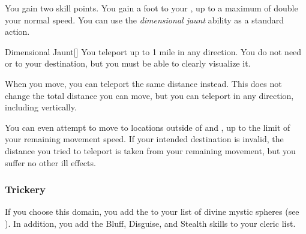              You gain two skill points.
             You gain a  foot  to your , up to a maximum of double your normal speed.
             You can use the \textit{dimensional jaunt} ability as a standard action.
            \begin{apability}{Dimensional Jaunt}[]
                You teleport up to 1 mile in any direction.
                You do not need  or  to your destination, but you must be able to clearly visualize it.
            \end{apability}
             When you move, you can teleport the same distance instead.
            This does not change the total distance you can move, but you can teleport in any direction, including vertically.

            You can even attempt to move to locations outside of  and , up to the limit of your remaining movement speed.
            If your intended destination is invalid, the distance you tried to teleport is taken from your remaining movement, but you suffer no other ill effects.

        \subsubsection{Trickery}
            If you choose this domain, you add the   to your list of divine mystic spheres (see ).
            In addition, you add the Bluff, Disguise, and Stealth skills to your cleric  list.

